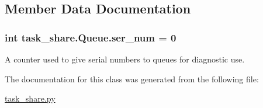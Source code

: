 \subsection{Member Data Documentation}
\subsubsection[{\texorpdfstring{ser\+\_\+num}{ser_num}}]{\setlength{\rightskip}{0pt plus 5cm}int task\+\_\+share.\+Queue.\+ser\+\_\+num = 0\hspace{0.3cm}{\ttfamily [static]}}\hypertarget{classtask__share_1_1Queue_a6f9d87b116eb16dba0867d3746af9f5f}{}\label{classtask__share_1_1Queue_a6f9d87b116eb16dba0867d3746af9f5f}


A counter used to give serial numbers to queues for diagnostic use. 



The documentation for this class was generated from the following file\+:\begin{DoxyCompactItemize}
\item 
\hyperlink{task__share_8py}{task\+\_\+share.\+py}\end{DoxyCompactItemize}
